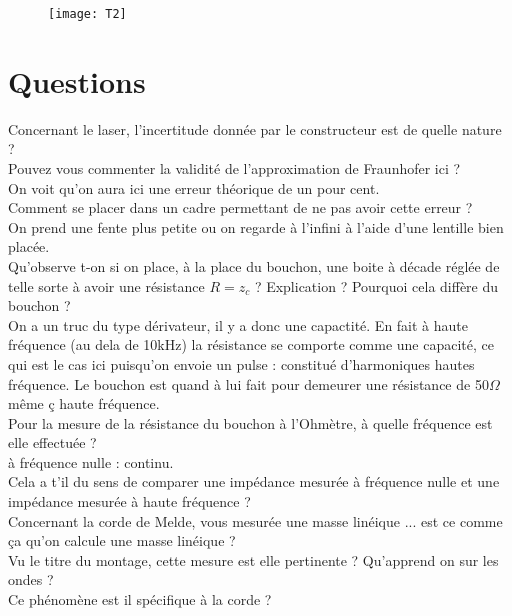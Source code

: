 \documentclass[12pt,prb,aps,epsf]{article}
\begin{document}
\begin{figure}
	\centerline{\texttt{[image: T2]}}
\end{figure}

\section*{Questions}
Concernant le laser, l'incertitude donnée par le constructeur est de quelle nature ?\\

Pouvez vous commenter la validité de l'approximation de Fraunhofer ici ?\\
On voit qu'on aura ici une erreur théorique de un pour cent.\\

Comment se placer dans un cadre permettant de ne pas avoir cette erreur ?\\
On prend une fente plus petite ou on regarde à l'infini à l'aide d'une lentille bien placée.\\

Qu'observe t-on si on place, à la place du bouchon, une boite à décade réglée de telle sorte à avoir une résistance $R=z_c$ ? Explication ? Pourquoi cela diffère du bouchon ?\\
On a un truc du type dérivateur, il y a donc une capactité. En fait à haute fréquence (au dela de 10kHz) la résistance se comporte comme une capacité, ce qui est le cas ici puisqu'on envoie un pulse : constitué d'harmoniques hautes fréquence. Le bouchon est quand à lui fait pour demeurer une résistance de 50$\Omega$ même ç haute fréquence.\\

Pour la mesure de la résistance du bouchon à l'Ohmètre, à quelle fréquence est elle effectuée ?\\
à fréquence nulle : continu.\\

Cela a t'il du sens de comparer une impédance mesurée à fréquence nulle et une impédance mesurée à haute fréquence ?\\

Concernant la corde de Melde, vous mesurée une masse linéique ... est ce comme ça qu'on calcule une masse linéique ?\\

Vu le titre du montage, cette mesure est elle pertinente ? Qu'apprend on sur les ondes ?\\

Ce phénomène est il spécifique à la corde ?\\


	
	
	
\end{document}
